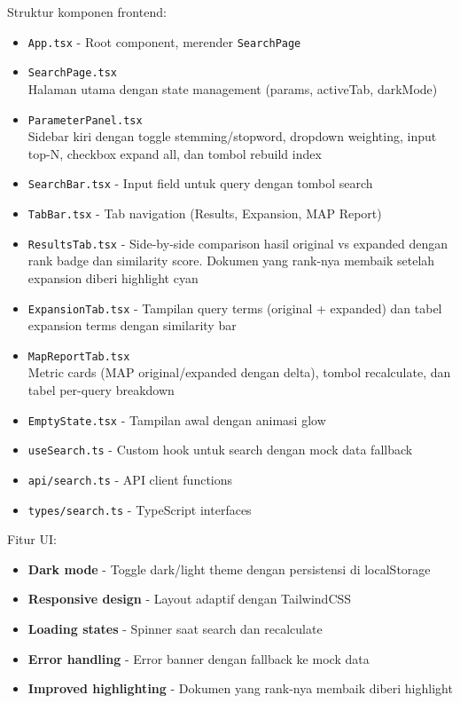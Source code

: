 \documentclass[12pt,a4paper]{report}
\begin{document}
Struktur komponen frontend:
\begin{itemize}
    \item \texttt{App.tsx} - Root component, merender \texttt{SearchPage}
    \item \texttt{SearchPage.tsx}\\ Halaman utama dengan state management (params, activeTab, darkMode)
    \item \texttt{ParameterPanel.tsx}\\ Sidebar kiri dengan toggle stemming/stopword, dropdown weighting, input top-N, checkbox expand all, dan tombol rebuild index
    \item \texttt{SearchBar.tsx} - Input field untuk query dengan tombol search
    \item \texttt{TabBar.tsx} - Tab navigation (Results, Expansion, MAP Report)
    \item \texttt{ResultsTab.tsx} - Side-by-side comparison hasil original vs expanded dengan rank badge dan similarity score. Dokumen yang rank-nya membaik setelah expansion diberi highlight cyan
    \item \texttt{ExpansionTab.tsx} - Tampilan query terms (original + expanded) dan tabel expansion terms dengan similarity bar
    \item \texttt{MapReportTab.tsx}\\ Metric cards (MAP original/expanded dengan delta), tombol recalculate, dan tabel per-query breakdown
    \item \texttt{EmptyState.tsx} - Tampilan awal dengan animasi glow
    \item \texttt{useSearch.ts} - Custom hook untuk search dengan mock data fallback
    \item \texttt{api/search.ts} - API client functions
    \item \texttt{types/search.ts} - TypeScript interfaces
\end{itemize}

Fitur UI:
\begin{itemize}
    \item \textbf{Dark mode} - Toggle dark/light theme dengan persistensi di localStorage
    \item \textbf{Responsive design} - Layout adaptif dengan TailwindCSS
    \item \textbf{Loading states} - Spinner saat search dan recalculate
    \item \textbf{Error handling} - Error banner dengan fallback ke mock data
    \item \textbf{Improved highlighting} - Dokumen yang rank-nya membaik diberi highlight
\end{itemize}
\end{document}
